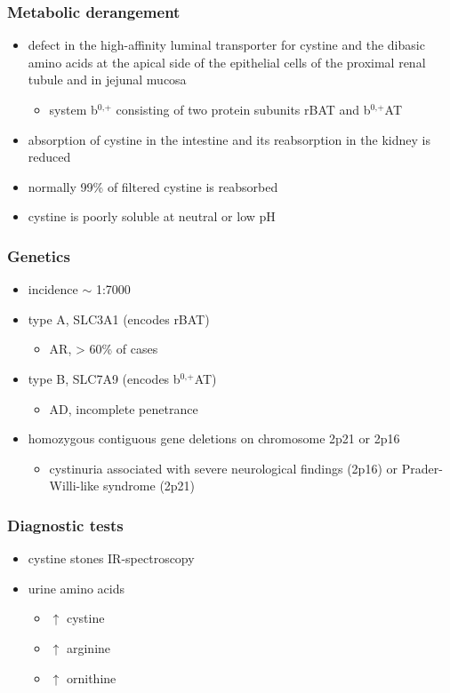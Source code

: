 \documentclass{scrartcl}
\begin{document}
\subsubsection{Metabolic derangement}
\label{sec:org862c8e0}
\begin{itemize}
\item defect in the high-affinity luminal transporter for cystine and the
dibasic amino acids at the apical side of the epithelial cells of
the proximal renal tubule and in jejunal mucosa 
\begin{itemize}
\item system b\(^{\text{0,+}}\) consisting of two protein subunits rBAT and b\(^{\text{0,+}}\)AT
\end{itemize}
\item absorption of cystine in the intestine and its reabsorption in the
kidney is reduced
\item normally 99\% of filtered cystine is reabsorbed
\item cystine is poorly soluble at neutral or low pH
\end{itemize}

\subsubsection{Genetics}
\label{sec:org11ec80c}
\begin{itemize}
\item incidence \(\sim\) 1:7000
\item type A, SLC3A1 (encodes rBAT)
\begin{itemize}
\item AR, \textgreater{} 60\% of cases
\end{itemize}
\item type B, SLC7A9 (encodes b\(^{\text{0,+}}\)AT)
\begin{itemize}
\item AD, incomplete penetrance
\end{itemize}
\item homozygous contiguous gene deletions on chromosome 2p21 or 2p16
\begin{itemize}
\item cystinuria associated with severe neurological findings (2p16) or
Prader-Willi-like syndrome (2p21)
\end{itemize}
\end{itemize}

\subsubsection{Diagnostic tests}
\label{sec:org849b3c5}
\begin{itemize}
\item cystine stones IR-spectroscopy
\item urine amino acids
\begin{itemize}
\item \(\uparrow\) cystine
\item \(\uparrow\) arginine
\item \(\uparrow\) ornithine
\end{itemize}
\end{itemize}
\end{document}
